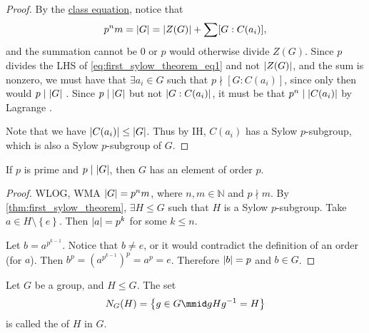 \documentclass[notoc,notitlepage,nobib]{tufte-book}
\begin{document}
\begin{proof}
  \noindent
  By the \hyperref[crly:class_equation]{class equation},
  notice that
  \begin{equation}\label{eq:first_sylow_theorem_eq1}
    p^n m = \left|G\right| = \left|Z(G)\right| + \sum [ G : C(a_i) ],
  \end{equation}
  and the summation cannot be $0$ or $p$ would otherwise
  divide $Z(G)$.
  Since $p$ divides the LHS of \cref{eq:first_sylow_theorem_eq1} and not
  $\left|Z(G)\right|$, and the sum is nonzero, we must have that $\exists a_i \in G$
  such that $p \nmid [ G : C(a_i) ]$, since only then would $p \mid \left|G\right|$
  .
  Since $p \mid \left|G\right|$ but not $\left| G : C(a_i)\right|$, it must be that $p^n \mid
  \left|C(a_i)\right|$ by Lagrange
  .

  Note that we have $\left|C(a_i)\right| \leq \left|G\right|$.  Thus by IH, $C(a_i)$ has a
  Sylow $p$-subgroup, which is also a Sylow $p$-subgroup of $G$.
\end{proof}

\begin{crly}\label{crly:cauchy_s_theorem}
  If $p$ is prime and $p \mid \left|G\right|$, then $G$ has an element of order $p$.
\end{crly}

\begin{proof}
  WLOG, WMA $\left|G\right| = p^n m$, where $n, m \in \mathbb{N}$ and
  $p \nmid m$. By \cref{thm:first_sylow_theorem}, $\exists H \leq G$
  such that $H$ is a Sylow $p$-subgroup.
  Take $a \in H \setminus \left\{ e \right\}$. Then $\left|a\right| = p^k$
  for some $k \leq n$.

  Let $b = a^{p^{k - 1}}$. Notice that $b \neq e$, or it would
  contradict the definition of an order (for $a$).
  Then $b^p = \left( a^{p^{k - 1}} \right)^p = a^p = e$.
  Therefore $\left|b\right| = p$ and $b \in G$.
\end{proof}

\begin{defn}[Normalizer]\label{defn:normalizer}
  Let $G$ be a group, and $H \leq G$. The set
  \begin{equation*}
    N_G(H) = \left\{ g \in G \mmid gHg^{-1} = H \right\}
  \end{equation*}
  is called the  of $H$ in $G$.
\end{defn}
\end{document}
